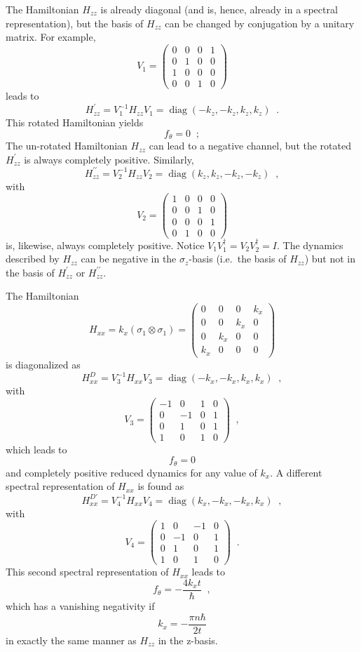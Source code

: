 The Hamiltonian $H_{zz}$ is already diagonal (and is, hence, already in a spectral representation), but the basis of $H_{zz}$ can be changed by conjugation by a unitary matrix.  For example, 
\begin{equation}
\label{eqn:V1basis}
V_1 = \begin{pmatrix}
0&0&0&1\\
0&1&0&0\\
1&0&0&0\\
0&0&1&0
\end{pmatrix} 
\end{equation}
leads to
$$
H^\prime_{zz} = V_1^{-1} H_{zz} V_1 = \operatorname{diag}(-k_z,-k_z,k_z,k_z)\;\;.
$$
This rotated Hamiltonian yields
$$
f_\theta = 0\;\;;
$$
The un-rotated Hamiltonian $H_{zz}$ can lead to a negative channel, but the rotated $H_{zz}^\prime$ is always completely positive.  Similarly,
$$
H^{\prime\prime}_{zz} = V_2^{-1} H_{zz} V_2 = \operatorname{diag}(k_z,k_z,-k_z,-k_z)\;\;,
$$
with 
$$
V_2 = \begin{pmatrix}
1&0&0&0\\
0&0&1&0\\
0&0&0&1\\
0&1&0&0
\end{pmatrix} 
$$
is, likewise, always completely positive.  Notice $V_1V_1^\dagger = V_2V_2^\dagger = I$.  The dynamics described by $H_{zz}$ can be negative in the $\sigma_z$-basis (i.e.\ the basis of $H_{zz}$) but not in the basis of $H^{\prime}_{zz}$ or $H^{\prime\prime}_{zz}$.

The Hamiltonian
$$
H_{xx} = k_x \left(\sigma_1\otimes\sigma_1\right) = \begin{pmatrix}
0&0&0&k_x\\
0&0&k_x&0\\
0&k_x&0&0\\
k_x&0&0&0
\end{pmatrix}
$$
is diagonalized as
$$
H_{xx}^D = V_3^{-1} H_{xx} V_3 = \operatorname{diag}(-k_x,-k_x,k_x,k_x)\;\;,
$$ 
with
$$
V_3 = \begin{pmatrix}
 -1 & 0 & 1 & 0 \\
 0 & -1 & 0 & 1 \\
 0 & 1 & 0 & 1 \\
 1 & 0 & 1 & 0
\end{pmatrix}\;\;,
$$
which leads to 
$$
f_\theta = 0
$$
and completely positive reduced dynamics for any value of $k_x$.  A different spectral representation of $H_{xx}$ is found as
$$
H_{xx}^{D\prime} = V_4^{-1} H_{xx} V_4 = \operatorname{diag}(k_x,-k_x,-k_x,k_x)\;\;,
$$
with
$$
V_4 = \begin{pmatrix}
 1 & 0 & -1 & 0 \\
 0 & -1 & 0 & 1 \\
 0 & 1 & 0 & 1 \\
 1 & 0 & 1 & 0
\end{pmatrix}\;\;.
$$
This second spectral representation of $H_{xx}$ leads to
$$
f_\theta = -\frac{4k_xt}{\hbar}\;\;,
$$
which has a vanishing negativity if
\begin{equation}
\label{eqn:neg_Hxx}
k_x = -\frac{\pi n \hbar}{2t}
\end{equation}
in exactly the same manner as $H_{zz}$ in the z-basis.  

